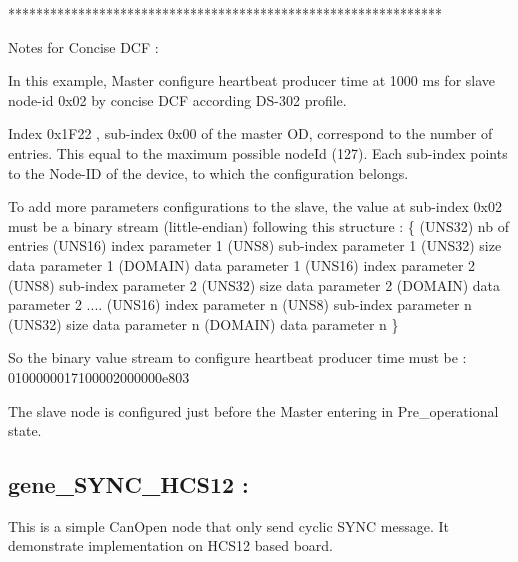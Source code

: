 \documentclass[a4paper,12pt]{book}
\begin{document}
{\ttfamily
**************************************************************}


\bigskip

{\sffamily
Notes for Concise DCF :}


\bigskip

{\sffamily
 In this example, Master configure \space heartbeat producer time at 1000 ms
for slave node{}-id 0x02 by concise DCF according DS{}-302 profile. }

{\sffamily
 }

{\sffamily
 Index 0x1F22 , sub{}-index 0x00 of the master OD, correspond to the
number of entries. This equal to the maximum possible nodeId (127).
Each sub{}-index points to the Node{}-ID of the device, to which the
configuration belongs. }


\bigskip

{\sffamily
 To add more parameters configurations to the slave, the value at
sub{}-index 0x02 must be a binary stream (little{}-endian) following
this structure :\newline
\{
(UNS32) nb of entries\newline
(UNS16) index parameter 1\newline
(UNS8) sub{}-index parameter 1\newline
(UNS32) size data parameter 1\newline
(DOMAIN) data parameter 1\newline
(UNS16) index parameter 2\newline
(UNS8) sub{}-index parameter 2\newline
(UNS32) size data parameter 2\newline
(DOMAIN) data parameter 2\newline
\space \space \space \space \space ....\newline
(UNS16) index parameter n\newline
(UNS8) sub{}-index parameter n\newline
(UNS32) size data parameter n\newline
(DOMAIN) data parameter n\newline
\}
}

{\sffamily
 So the binary value stream to configure heartbeat producer time must be
:\newline
    0100000017100002000000e803}

{\sffamily
The slave node is configured just before the Master entering in
Pre\_operational state.}

\subsection{gene\_SYNC\_HCS12 :}
This is a simple CanOpen node that only send cyclic SYNC message. It
demonstrate implementation on HCS12 based board.
\end{document}
